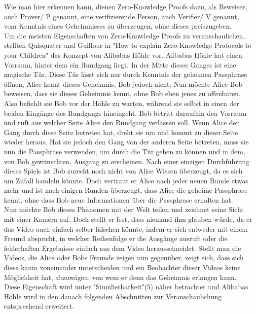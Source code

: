 \documentclass {article}
\begin{document}
Wie man hier erkennen kann, dienen Zero-Knowledge Proofs dazu, als Beweiser, auch Prover/ P genannt, eine
verifizierende Person, auch Verifier/ V genannt, vom Kenntnis eines Geheimnisses zu überzeugen, ohne dieses preiszugeben. \\ 

Um die meisten Eigenschaften von Zero-Knowledge Proofs zu veranschaulichen, stellten Quisquater und Guillous in "How to explain Zero-Knowledge Protocols to your Children"\cite{GQ89} das Konzept von Alibabas H\"ohle vor.
Alibabas H\"ohle hat einen Vorraum, hinter dem ein Rundgang liegt. In der Mitte dieses Ganges ist eine magische T\"ur. Diese T\"ur l\"asst sich nur durch Kenntnis der geheimen Passphrase \"offnen,
Alice kennt dieses Geheimnis, Bob jedoch nicht.
Nun m\"ochte Alice Bob beweisen, dass sie dieses Geheimnis kennt, ohne Bob eben jenes zu offenbaren. Also befiehlt sie Bob vor der H\"ohle zu warten, w\"ahrend sie selbst in einen der beiden Eing\"ange des Rundgangs hineingeht. Bob betritt daraufhin den Vorraum und ruft aus welcher Seite Alice den Rundgang verlassen soll. Wenn Alice den Gang durch diese Seite betreten hat, dreht sie um und kommt zu dieser Seite wieder heraus. Hat sie jedoch den Gang von der anderen Seite betreten, muss sie nun die Passphrase verwenden, um durch die T\"ur gehen zu k\"onnen und in dem, von Bob gewünschten, Ausgang zu erscheinen. Nach einer einzigen Durchf\"uhrung dieses Spiels ist Bob zurecht noch nicht von Alice Wissen \"uberzeugt, da es sich um Zufall handeln k\"onnte. Doch vertraut er Alice nach jeder neuen Runde etwas mehr und ist nach einigen Runden \"uberzeugt, dass Alice die geheime Passphrase kennt, ohne dass Bob neue Informationen \"uber die Passphrase erhalten hat. \\  Nun m\"ochte Bob dieses Ph\"anomen mit der Welt teilen und zeichnet seine Sicht mit einer Kamera auf. Doch stellt er fest, dass niemand ihm glauben würde, da er das Video auch einfach selber f\"alschen k\"onnte, indem er sich entweder mit einem Freund abspricht, in welcher Reihenfolge er die Ausg\"ange ausruft oder die fehlerhaften Ergebnisse einfach aus dem Video herausschneidet. 
Stellt man die Videos, die Alice oder Bobs Freunde zeigen nun gegen\"uber, zeigt sich, dass sich diese kaum voneinander unterscheiden und ein Beobachter dieser Videos keine M\"oglichkeit hat, abzuw\"agen, von wem er denn das Geheimnis erlangen kann.
Diese Eigenschaft wird unter "Simulierbarkeit"(5) n\"aher betrachtet und Alibabas H\"ohle wird in den danach folgenden Abschnitten zur Veranschaulichung entsprechend erweitert.
\end{document}
